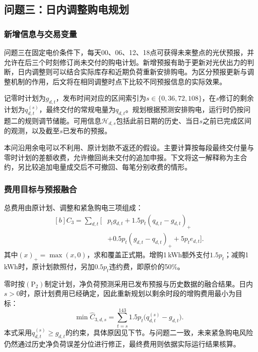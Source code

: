 \subsection{问题三：日内调整购电规划}\label{sec:q3}
\subsubsection{新增信息与交易变量}
问题三在固定电价条件下，每天00、06、12、18点可获得未来整点的光伏预报，并允许在后三个时刻修订尚未交付的购电计划。新增预报有助于更新对光伏出力的判断，日内调整则可以结合实际库存和近期负荷重新安排购电。为区分预报更新与调整机制的作用，后文将在相同调整时点下比较不同预报信息的实际效果。

记零时计划为$g_{d,t}$，发布时间对应的区间索引为$s\in\{0,36,72,108\}$，在$s$修订的剩余计划为$q^{(s)}_{d,t}$，最终交付的常规电量为$q_{d,t}$。规划根据预测安排购电，运行时仍按问题二的规则调节储能。可用信息$\mathcal H_{d,s}$包括此前日期的历史、当日$s$之前已完成区间的观测，以及截至$s$已发布的预报。

本问沿用余电可以不利用、原计划款不返还的假设。主要计算按每段最终交付量与零时计划的差额收费，允许撤回尚未交付的追加申报。下文将这一解释称为主合约，另比较追加电量成交后不可撤回、每笔分别收费的情形。

\subsubsection{费用目标与预报融合}
总费用由原计划、调整和紧急购电三项组成：
\begin{equation}
\begin{aligned}[b]
 C_3=\sum_{d,t}\bigl[&p_tg_{d,t}
 +1.5p_t(q_{d,t}-g_{d,t})_+\\
 &+0.5p_t(g_{d,t}-q_{d,t})_+
 +5p_te_{d,t}\bigr].
\end{aligned}\label{eq:netbill}
\end{equation}
其中$(x)_+=\max(x,0)$，求和覆盖正式期。增购1\,kWh额外支付$1.5p_t$；减购1\,kWh时，原计划款照付，另加$0.5p_t$违约费，即原价的50\%。

零时按$(\mathrm P_2)$制定计划，净负荷预测采用已发布预报与历史数据的融合结果。日内$s>0$时，原计划费用已经确定，因此重新规划以剩余时段的增购费用最小为目标：
\begin{equation}
 \min \widehat C_{3,d,s}=\sum_{t=s}^{143}1.5p_t\bigl(q^{(s)}_{d,t}-g_{d,t}\bigr).\label{eq:replan}
\end{equation}
本式采用$q^{(s)}_{d,t}\ge g_{d,t}$的约束，具体原因见下节。与问题二一致，未来紧急购电风险仍然通过历史净负荷误差分位进行修正，最终费用则依据实际运行结果核算。


